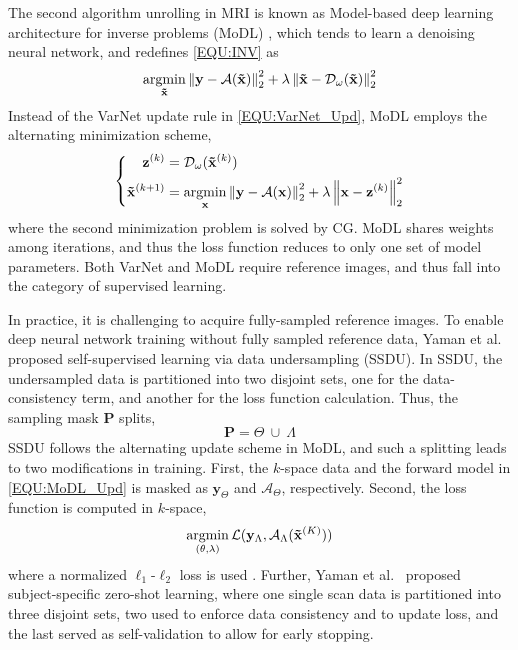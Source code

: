 \documentclass[journal,twoside,web]{ieeecolor}
\newcommand{\argmin}{\operatornamewithlimits{argmin}}
\newcommand{\norm}[1]{\left\lVert#1\right\rVert}
\begin{document}
    The second algorithm unrolling in MRI is known as
    Model-based deep learning architecture for inverse problems (MoDL)
    \cite{aggarwal_2018_modl},
    which tends to learn a denoising neural network,
    and redefines \cref{EQU:INV} as
    \begin{equation}
		\argmin_{\mathbf{\tilde{x}}} \norm{\mathbf{y} - \mathcal{A}(\mathbf{\tilde{x}})}_2^2 + \lambda \norm{ \mathbf{\tilde{x}} - \mathcal{D}_{\omega}(\mathbf{\tilde{x}}) }_2^2
		\label{EQU:DINV}
	\end{equation}
    Instead of the VarNet update rule in \cref{EQU:VarNet_Upd},
    MoDL employs the alternating minimization scheme,
    \begin{equation} \label{EQU:MoDL_Upd}
        \left\{\begin{aligned}
            \mathbf{z}^{(k)} &= \mathcal{D}_{\omega} (\mathbf{\tilde{x}}^{(k)}) \\
            \mathbf{\tilde{x}}^{(k+1)} &= \argmin_{\mathbf{x}} \norm{\mathbf{y} - \mathcal{A}(\mathbf{x})}_2^2 + \lambda \norm{ \mathbf{x} - \mathbf{z}^{(k)} }_2^2
        \end{aligned}\right.
    \end{equation}
    where the second minimization problem is solved by CG.
    MoDL shares weights among iterations, and thus the loss function reduces to
    only one set of model parameters.
    Both VarNet and MoDL require reference images,
    and thus fall into the category of supervised learning.

    In practice, it is challenging to acquire fully-sampled reference images.
    To enable deep neural network training without fully sampled reference data,
    Yaman et al.~\cite{yaman_2020_ssdu} proposed self-supervised learning via data undersampling (SSDU).
    In SSDU, the undersampled data is partitioned into two disjoint sets,
    one for the data-consistency term, and another for the loss function calculation.
    Thus, the sampling mask $\mathbf{P}$ splits,
    \begin{equation}
        \mathbf{P} = \Theta ~\cup~ \Lambda
    \end{equation}
    SSDU follows the alternating update scheme in MoDL,
    and such a splitting leads to two modifications in training.
    First, the $k$-space data and the forward model in \cref{EQU:MoDL_Upd} is masked as
    $\mathbf{y}_{\Theta}$ and $\mathcal{A}_{\Theta}$, respectively.
    Second, the loss function is computed in $k$-space,
    \begin{equation}
        \argmin_{(\theta, \lambda)} \mathcal{L} (\mathbf{y}_{\Lambda}, \mathcal{A}_{\Lambda}(\mathbf{\tilde{x}}^{(K)}))
        \label{EQU:SSDU_Loss}
    \end{equation}
    where a normalized $\ell_1$-$\ell_2$ loss is used \cite{yaman_2020_ssdu}.
    Further, Yaman et al.~\cite{yaman_2022_zs} proposed subject-specific zero-shot learning,
    where one single scan data is partitioned into three disjoint sets,
    two used to enforce data consistency and to update loss,
    and the last served as self-validation to allow for early stopping.
\end{document}
